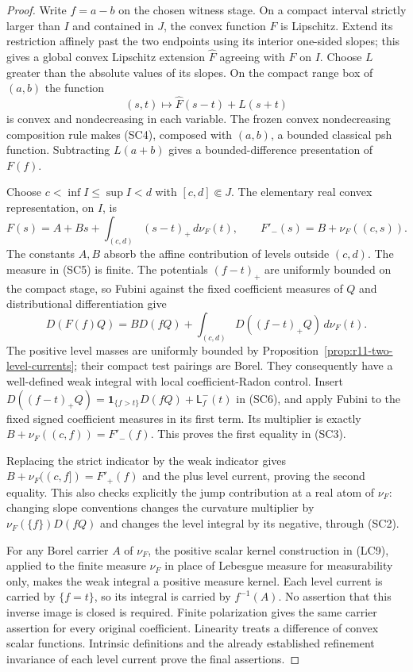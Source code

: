 \documentclass[11pt,a4paper]{article}
\numberwithin{equation}{section}
\theoremstyle{definition}
\theoremstyle{remark}
\begin{document}
\begin{proof}
Write $f=a-b$ on the chosen witness stage.  On a compact interval
strictly larger than $I$ and contained in $J$, the convex function
$F$ is Lipschitz.  Extend its restriction affinely past the two
endpoints using its interior one-sided slopes; this gives a global
convex Lipschitz extension $\widehat F$ agreeing with $F$ on $I$.
Choose $L$ greater than the absolute values of its slopes.  On the
compact range box of $(a,b)$ the function
\[
                  (s,t)\longmapsto\widehat F(s-t)+L(s+t)
 \tag{SC4}
\]
is convex and nondecreasing in each variable.  The frozen
convex nondecreasing composition rule makes (SC4), composed
with $(a,b)$, a bounded classical psh function.  Subtracting
$L(a+b)$ gives a bounded-difference presentation of $F(f)$.

Choose $c<\inf I\leq\sup I<d$ with $[c,d]\Subset J$.
The elementary real convex representation, on $I$, is
\[
 F(s)=A+Bs+\int_{(c,d)}(s-t)_+\,d\nu_F(t),\qquad
 F'_-(s)=B+\nu_F((c,s)).
 \tag{SC5}
\]
The constants $A,B$ absorb the affine contribution of levels
outside $(c,d)$.  The measure in (SC5) is finite.  The
potentials $(f-t)_+$ are uniformly bounded on the compact
stage, so Fubini against the fixed coefficient measures of
$Q$ and distributional differentiation give
\[
 D(F(f)Q)=B D(fQ)
           +\int_{(c,d)}D((f-t)_+Q)\,d\nu_F(t).
 \tag{SC6}
\]
The positive level masses are uniformly bounded by
Proposition~\ref{prop:r11-two-level-currents}; their compact
test pairings are Borel.  They consequently have a well-defined
weak integral with local coefficient-Radon control.  Insert
$D((f-t)_+Q)=\mathbf1_{\{f>t\}}D(fQ)+\mathsf L_f^-(t)$
in (SC6), and apply Fubini to the fixed signed coefficient
measures in its first term.  Its multiplier is exactly
$B+\nu_F((c,f))=F'_-(f)$.  This proves the first equality
in (SC3).

Replacing the strict indicator by the weak indicator gives
$B+\nu_F((c,f])=F'_+(f)$ and the plus level current, proving
the second equality.  This also checks explicitly the jump
contribution at a real atom of $\nu_F$: changing slope
conventions changes the curvature multiplier by
$\nu_F(\{f\})D(fQ)$ and changes the level integral by its
negative, through (SC2).

For any Borel carrier $A$ of $\nu_F$, the positive scalar
kernel construction in (LC9), applied to the finite measure
$\nu_F$ in place of Lebesgue measure for measurability only,
makes the weak integral a positive measure kernel.  Each level
current is carried by $\{f=t\}$, so its integral is carried
by $f^{-1}(A)$.  No assertion that this inverse image is
closed is required.  Finite polarization gives the same
carrier assertion for every original coefficient.
Linearity treats a difference of convex scalar functions.
Intrinsic definitions and the already established refinement
invariance of each level current prove the final assertions.
\end{proof}
\end{document}
